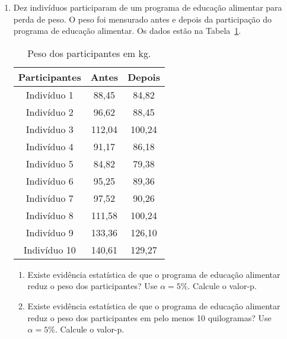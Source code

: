 \documentclass[8pt, a4paper]{article}
\begin{document}
\begin{enumerate}
	\item Dez indivíduos participaram de um programa de educação alimentar para perda de peso. O peso foi mensurado antes e depois da participação do programa de educação alimentar. Os dados estão na Tabela~\ref{tab:participante-kg}.
	\begin{table}[ht]
		\centering
		\begin{tabular}{c|cc}
			\toprule[0.05cm]
			Participantes & Antes & Depois \\ 
			\midrule[0.025cm]
			Indivíduo 1 & 88,45 & 84,82 \\ 
			Indivíduo 2 & 96,62 & 88,45 \\ 
			Indivíduo 3 & 112,04 & 100,24 \\ 
			Indivíduo 4 & 91,17 & 86,18 \\ 
			Indivíduo 5 & 84,82 & 79,38 \\ 
			Indivíduo 6 & 95,25 & 89,36 \\ 
			Indivíduo 7 & 97,52 & 90,26 \\ 
			Indivíduo 8 & 111,58 & 100,24 \\ 
			Indivíduo 9 & 133,36 & 126,10 \\ 
			Indivíduo 10 & 140,61 & 129,27 \\ 
			\bottomrule[0.05cm]
		\end{tabular}
		\caption{Peso dos participantes em kg.} 
		\label{tab:participante-kg}
	\end{table}
	\begin{enumerate}
		\item Existe evidência estatística de que o programa de educação alimentar reduz o peso dos participantes? Use $\alpha = 5\%$. Calcule o valor-p. 
		\item Existe evidência estatística de que o programa de educação alimentar reduz o peso dos participantes em pelo menos 10 quilogramas? Use $\alpha = 5\%$. Calcule o valor-p. 
	\end{enumerate}


\end{enumerate}
\end{document}
